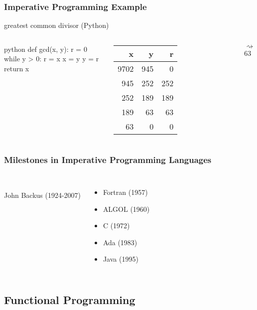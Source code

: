 \documentclass[dvipsnames]{beamer}
\theoremstyle{plain}
\begin{document}
\begin{frame}[fragile]
  \frametitle{Imperative Programming Example}

  \begin{exampleblock}{greatest common divisor (Python)}
    \begin{columns}
      \begin{pygments}{python}
def gcd(x, y):
    r = 0
    while y > 0:
        r = x %
        x = y
        y = r
    return x
      \end{pygments}

      \begin{tabular}{|r|r|r|}\hline
   x &   y &   r\\\hline\hline
9702 & 945 &   0\\\hline
 945 & 252 & 252\\\hline
 252 & 189 & 189\\\hline
 189 &  63 &  63\\\hline
  63 &   0 &   0\\\hline
      \end{tabular}

      \medskip
      $\rightsquigarrow$ 63
    \end{columns}
  \end{exampleblock}
\end{frame}

\begin{frame}
  \frametitle{Milestones in Imperative Programming Languages}

  \begin{columns}
    \begin{center}
      \\
      John Backus (1924-2007)
    \end{center}

    \begin{itemize}
      \item Fortran (1957)
      \item ALGOL (1960)
      \item C (1972)
      \item Ada (1983)
      \item Java (1995)
    \end{itemize}
  \end{columns}
\end{frame}

\subsection{Functional Programming}
\end{document}
